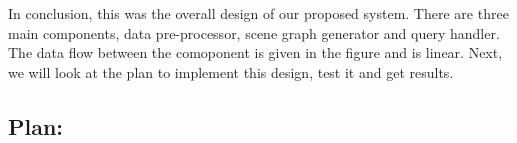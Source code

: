 In conclusion, this was the overall design of our proposed system. There are three main components, data pre-processor, scene graph generator and query handler. The 
data flow between the comoponent is given in the figure and is linear. Next, we will look at the plan to implement this design, test it and get results.

\subsection{Plan:}

